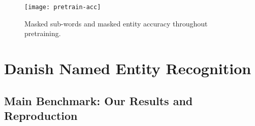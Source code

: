 \documentclass[main.tex]{subfiles}
\begin{document}
\begin{figure}[H]
    \centering
    \texttt{[image: pretrain-acc]}
    \caption{Masked sub-words and masked entity accuracy throughout pretraining.}
    \label{fig:pretrain-acc}
\end{figure}\noindent

\section{Danish Named Entity Recognition}%
\subsection{Main Benchmark: Our Results and Reproduction}





\end{document}
